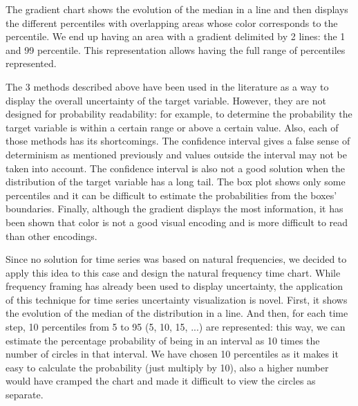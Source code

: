 \documentclass[a4paper,3p,sort&compress]{elsarticle}
\begin{document}
The gradient chart shows the evolution of the median in a line and then displays the different percentiles
with overlapping areas whose color corresponds to the percentile. We end up having an area with a gradient 
delimited by 2 lines: the 1 and 99 percentile. This representation allows having the
 full range of percentiles represented.

The 3 methods described above have been used in the literature as a way to display the overall uncertainty 
of the target variable. However, they are not designed for probability readability: for example, to determine 
the probability the target variable is within a certain range or above a certain value. Also,
each of those methods has its shortcomings. The confidence interval gives a false sense of determinism as mentioned previously
and values outside the interval may not be taken into account. The confidence interval is also not a good solution 
when the distribution of the target variable has a long tail. The box plot shows only some percentiles and it can be difficult to 
estimate the probabilities from the boxes' boundaries. Finally, although the gradient displays the most information, it has been 
shown \cite{cleveland_graphical_1984} that color is not 
a good visual encoding and is more difficult to read than other encodings.

Since no solution for time series was based on natural frequencies, we decided to apply this idea to this case 
and design the natural frequency time chart.
While frequency framing has already been used to display uncertainty, the application of this technique for time series 
uncertainty visualization is novel. First, 
it shows the evolution of the median of the distribution in a line. And then, for each time 
step, 10 percentiles from 5 to 95 (5, 10, 15, ...) are represented: this way, we can estimate the percentage 
probability of being in an interval as 10 times the number of circles in that interval. 
We have chosen 10 percentiles as it makes it easy to calculate the probability (just multiply by 10), also a higher number
would have cramped the chart and made it difficult to view the circles as separate. 
\end{document}

